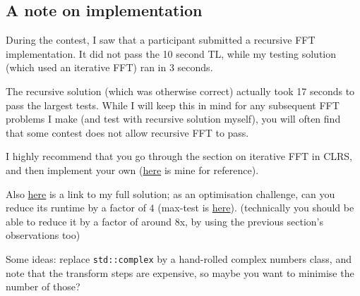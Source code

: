 	\subsection{A note on implementation}
		During the contest, I saw that a participant submitted a recursive FFT implementation.
		It did not pass the 10 second TL, while my testing solution (which used an iterative FFT)
		ran in 3 seconds.

		The recursive solution (which was otherwise correct) actually took 17 seconds to pass the
		largest tests. While I will keep this in mind for any subsequent FFT problems I make
		(and test with recursive solution myself), you will often find that some contest does not
		allow recursive FFT to pass.

		I highly recommend that you go through the section on iterative FFT in CLRS, and then implement
		your own (\href{https://github.com/parthmittal/codebook/blob/master/fastfft.cpp}{here} is mine
		for reference).

		Also \href{https://pastebin.com/Jf7H8Prp}{here} is a link to my full solution; as an optimisation challenge,
		can you reduce its runtime by a factor of $4$ (max-test is
		\href{https://drive.google.com/file/d/0B-W-TWxgtybGQzhvR0hGZUM2MU0/view?usp=sharing}{here}).
		(technically you should be able to reduce it by a factor of around 8x, by using the previous section's observations too)

		Some ideas: replace \verb|std::complex| by a hand-rolled complex numbers class, and note that the transform
		steps are expensive, so maybe you want to minimise the number of those?
